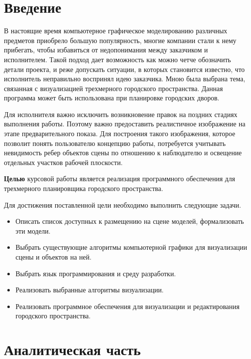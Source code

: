 \documentclass[a4paper,14pt, unknownkeysallowed]{extreport}
\begin{document}
\setcounter{page}{4}
\renewcommand{\contentsname}{Содержание} 
\tableofcontents


\setcounter{page}{5}
\chapter*{Введение}

В настоящие время компьютерное графическое моделированию различных предметов приобрело большую популярность, многие компании стали к нему прибегать, чтобы избавиться от недопонимания между заказчиком и исполнителем. Такой подход дает возможность как можно четче обозначить детали проекта, и реже допускать ситуации, в которых становится известно, что исполнитель неправильно воспринял идею заказчика. Мною была выбрана тема, связанная с визуализацией трехмерного городского пространства. Данная программа может быть использована при планировке городских дворов.

Для исполнителя важно исключить возникновение правок на поздних стадиях выполнения работы. Поэтому важно предоставить реалистичное изображение на этапе предварительного показа. Для построения такого изображения, которое позволит понять пользователю концепцию работы, потребуется учитывать невидимость ребер объектов сцены по отношению к наблюдателю и освещение отдельных участков рабочей плоскости.

\textbf{Целью} курсовой работы является реализация программного обеспечения для трехмерного планировщика городского пространства.

Для достижения поставленной цели необходимо выполнить следующие задачи.

\begin{itemize}
	\item Описать список доступных к размещению на сцене моделей, формализовать эти модели.
	\item Выбрать существующие алгоритмы компьютерной графики для визуализации сцены и объектов на ней.
	\item Выбрать язык программирования и среду разработки.
	\item Реализовать выбранные алгоритмы визуализации.
	\item Реализовать программное обеспечения для визуализации и редактирования городского пространства.
\end{itemize}





\chapter{Аналитическая часть}
\end{document}
